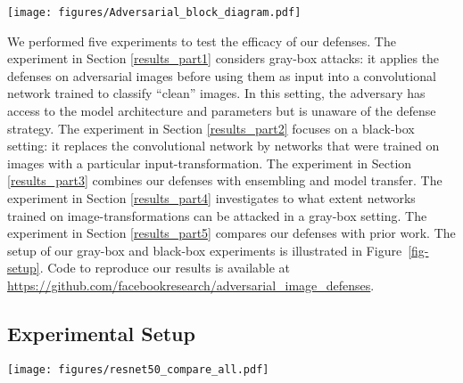 \begin{figure*}[t!]
    \centering
    \texttt{[image: figures/Adversarial\_block\_diagram.pdf]}
    \caption{Block diagram detailing the differences between the experimental setups in Section \ref{results_part1}, \ref{results_part2}, and \ref{results_part3}. We train networks (a) on regular images or (b) on transformed images; we test the networks on transformed adversarial images. For each of the three setups, dashed arrows indicate which model is used by the adversary and which model is used by the classification model.}\label{fig-setup}
\end{figure*}

We performed five experiments to test the efficacy of our defenses. The experiment in Section \ref{results_part1} considers gray-box attacks: it applies the defenses on adversarial images before using them as input into a convolutional network trained to classify ``clean'' images. In this setting, the adversary has access to the model architecture and parameters but is unaware of the defense strategy. The experiment in Section \ref{results_part2} focuses on a black-box setting: it replaces the convolutional network by networks that were trained on images with a particular input-transformation. The experiment in Section \ref{results_part3} combines our defenses with ensembling and model transfer. The experiment in Section \ref{results_part4} investigates to what extent networks trained on image-transformations can be attacked in a gray-box setting. The experiment in Section \ref{results_part5} compares our defenses with prior work. The setup of our gray-box and black-box experiments is illustrated in Figure~\ref{fig-setup}.
Code to reproduce our results is available at \url{https://github.com/facebookresearch/adversarial_image_defenses}.

\subsection{Experimental Setup}

\begin{figure*}[t!]
    \centering
    \texttt{[image: figures/resnet50\_compare\_all.pdf]}
    \caption{Top-1 classification accuracy of ResNet-50 \emph{tested} on transformed adversarial images produced by four attacks using five image transformations \emph{in a gray-box setting}: (1) cropping-rescaling, (2) bit-depth reduction, (3) JPEG compression, (4) total variance minimization, and (5) image quilting. The dotted line shows the top-1 accuracy of the ResNet-50 model on non-adversarial images, providing an upper bound on the effectiveness of a defense. An $L_2$-dissimilarity of $0.00$ corresponds to the classification accuracy on non-adversarial images. Higher is better.}\label{adv-acc}
\end{figure*}

